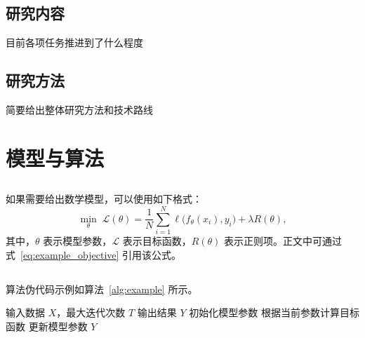 \documentclass[UTF8,a4paper,zihao=-4]{ctexart}
\numberwithin{equation}{section}
\numberwithin{figure}{section}
\numberwithin{table}{section}
\begin{document}
\subsection{研究内容}
\songti{}
目前各项任务推进到了什么程度

\subsection{研究方法}
\songti{}
简要给出整体研究方法和技术路线



\newpage
\section{模型与算法}

\subsection{}
\songti{}


如果需要给出数学模型，可以使用如下格式：
\begin{equation}
    \min_{\theta} \; \mathcal{L}(\theta)
    = \frac{1}{N}\sum_{i=1}^{N}\ell\bigl(f_{\theta}(x_i),y_i\bigr)
    + \lambda R(\theta),
    \label{eq:example_objective}
\end{equation}
其中，$\theta$ 表示模型参数，$\mathcal{L}$ 表示目标函数，$R(\theta)$ 表示正则项。正文中可通过式~\eqref{eq:example_objective} 引用该公式。



\subsection{}
\songti{}
算法伪代码示例如算法~\ref{alg:example} 所示。

\begin{algorithm}[htbp]
\renewcommand{\algorithmicrequire}{\textbf{输入：}}
\renewcommand{\algorithmicensure}{\textbf{输出：}}
\caption{示例算法}
\label{alg:example}
\begin{algorithmic}[1]
    \REQUIRE 输入数据 $X$，最大迭代次数 $T$
    \ENSURE 输出结果 $Y$
    \STATE 初始化模型参数
        \STATE 根据当前参数计算目标函数
        \STATE 更新模型参数
    \ENDFOR
    \RETURN $Y$
\end{algorithmic}
\end{algorithm}
\end{document}
